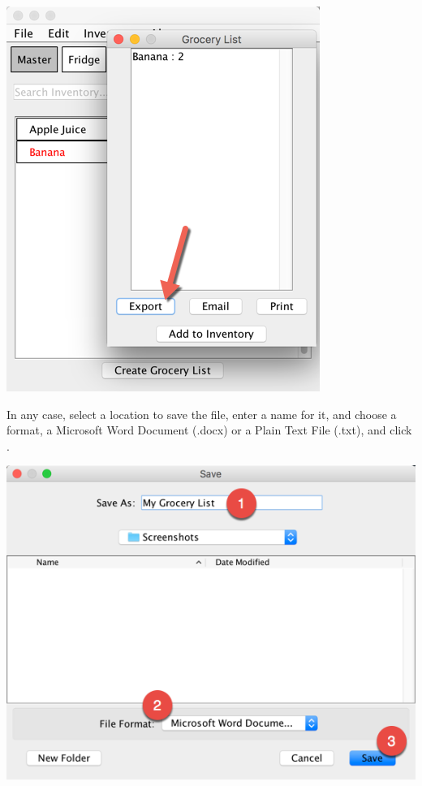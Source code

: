 \documentclass[letterpaper,12pt]{article}
\begin{document}
\centerline{\includegraphics[scale=0.5]{21.png}}

\pagebreak

		
		In any case, select a location to save the file, enter a name for it, and choose a format, a Microsoft Word Document (.docx) or a Plain Text File (.txt), and click .\\
		
	\centerline{\includegraphics[scale=0.5]{15.png}}

		
		 
\end{document}
